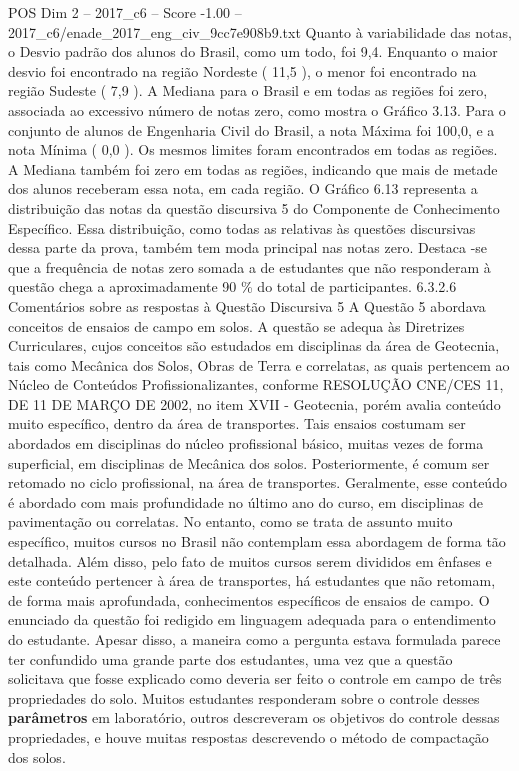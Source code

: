 \begin{textsample}{POS Dim 2 – 2017\_c6 – Score -1.00 – 2017\_c6/enade\_2017\_eng\_civ\_9cc7e908b9.txt}
Quanto à variabilidade das notas, o Desvio padrão dos alunos do Brasil, como um todo, foi 9,4.
Enquanto o maior desvio foi encontrado na região Nordeste ( 11,5 ), o menor foi encontrado na região Sudeste ( 7,9 ).
A Mediana para o Brasil e em todas as regiões foi zero, associada ao excessivo número de notas zero, como mostra o Gráfico 3.13.
Para o conjunto de alunos de Engenharia Civil do Brasil, a nota Máxima foi 100,0, e a nota Mínima ( 0,0 ).
Os mesmos limites foram encontrados em todas as regiões.
A Mediana também foi zero em todas as regiões, indicando que mais de metade dos alunos receberam essa nota, em cada região.
O Gráfico 6.13 representa a distribuição das notas da questão discursiva 5 do Componente de Conhecimento Específico.
Essa distribuição, como todas as relativas às questões discursivas dessa parte da prova, também tem moda principal nas notas zero.
Destaca -se que a frequência de notas zero somada a de estudantes que não responderam à questão chega a aproximadamente 90 \% do total de participantes. 6.3.2.6 Comentários sobre as respostas à Questão Discursiva 5 A Questão 5 abordava conceitos de ensaios de campo em solos.
A questão se adequa às Diretrizes Curriculares, cujos conceitos são estudados em disciplinas da área de Geotecnia, tais como Mecânica dos Solos, Obras de Terra e correlatas, as quais pertencem ao Núcleo de Conteúdos Profissionalizantes, conforme RESOLUÇÃO CNE/CES 11, DE 11 DE MARÇO DE 2002, no item XVII - Geotecnia, porém avalia conteúdo muito específico, dentro da área de transportes.
Tais ensaios costumam ser abordados em disciplinas do núcleo profissional básico, muitas vezes de forma superficial, em disciplinas de Mecânica dos solos.
Posteriormente, é comum ser retomado no ciclo profissional, na área de transportes.
Geralmente, esse conteúdo é abordado com mais profundidade no último ano do curso, em disciplinas de pavimentação ou correlatas.
No entanto, como se trata de assunto muito específico, muitos cursos no Brasil não contemplam essa abordagem de forma tão detalhada.
Além disso, pelo fato de muitos cursos serem divididos em ênfases e este conteúdo pertencer à área de transportes, há estudantes que não retomam, de forma mais aprofundada, conhecimentos específicos de ensaios de campo.
O enunciado da questão foi redigido em linguagem adequada para o entendimento do estudante.
Apesar disso, a maneira como a pergunta estava formulada parece ter confundido uma grande parte dos estudantes, uma vez que a questão solicitava que fosse explicado como deveria ser feito o controle em campo de três propriedades do solo.
Muitos estudantes responderam sobre o controle desses \textbf{parâmetros} em laboratório, outros descreveram os objetivos do controle dessas propriedades, e houve muitas respostas descrevendo o método de compactação dos solos.

\end{textsample}
